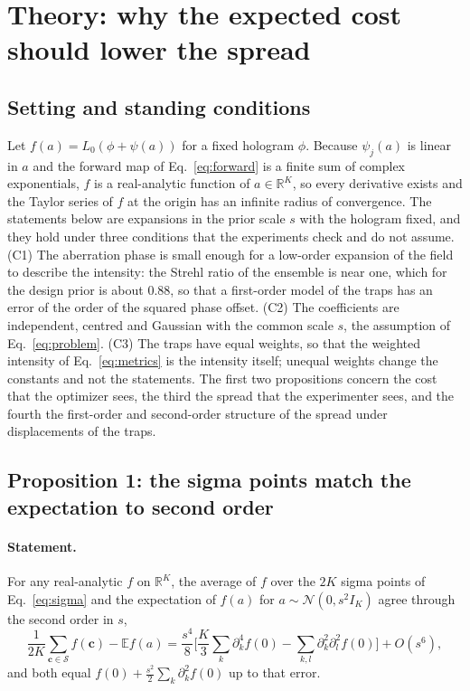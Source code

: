 \section{Theory: why the expected cost should lower the spread}\label{sec:theory}

\subsection{Setting and standing conditions}

Let $f(a)=L_0(\phi+\psi(a))$ for a fixed hologram $\phi$. Because $\psi_j(a)$ is linear in $a$ and the forward map of Eq.~\eqref{eq:forward} is a finite sum of complex exponentials, $f$ is a real-analytic function of $a\in\mathbb R^K$, so every derivative exists and the Taylor series
of $f$ at the origin has an infinite radius of convergence. The statements below are expansions in the prior scale $s$ with the hologram fixed, and they hold under three conditions that the experiments check and do not assume. (C1) The aberration phase is small enough for
a low-order expansion of the field to describe the intensity: the Strehl ratio of the ensemble is near one, which for the design prior is about $0.88$, so that a first-order model of the traps has an error of the order of the squared phase offset. (C2) The coefficients are independent, centred and Gaussian with the common scale $s$, the assumption
of Eq.~\eqref{eq:problem}. (C3) The traps have equal weights, so that the weighted intensity of Eq.~\eqref{eq:metrics} is the intensity itself; unequal weights change the constants and not the statements. The first two propositions concern the cost that the optimizer sees, the third the spread that the experimenter
sees, and the fourth the first-order and second-order structure of the spread under displacements of the traps.

\subsection{Proposition 1: the sigma points match the expectation to second order}

\paragraph{Statement.} For any real-analytic $f$ on $\mathbb R^K$, the average of $f$ over the $2K$ sigma points of Eq.~\eqref{eq:sigma} and the expectation of $f(a)$ for $a\sim\mathcal N(0,s^2I_K)$ agree through the second order in $s$,
\begin{equation}
\frac1{2K}\sum_{\mathbf c\in\mathcal S}f(\mathbf c)-\mathbb E f(a)=\frac{s^4}8\Big[\frac K3\sum_k\partial_k^4f(0)-\sum_{k,l}\partial_k^2\partial_l^2f(0)\Big]+O(s^6),\label{eq:sigmaerror}
\end{equation}
and both equal $f(0)+\frac{s^2}2\sum_k\partial_k^2f(0)$ up to that error.

